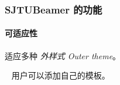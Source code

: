\documentclass{ctexbeamer}
\begin{document}
\begin{frame}
\frametitle{SJTUBeamer 的功能}

\paragraph{可适应性} 适应多种
\emph{外样式 Outer theme}。

~
用户可以添加自己的\alert{模板}。
\end{frame}
\end{document}
